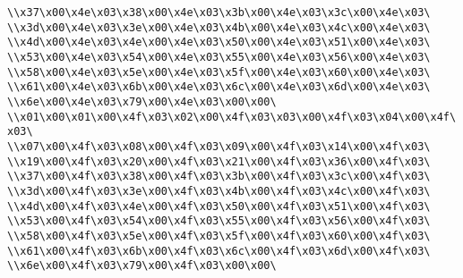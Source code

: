 \verb|\\x37\x00\x4e\x03\x38\x00\x4e\x03\x3b\x00\x4e\x03\x3c\x00\x4e\x03\|\newline
\verb|\\x3d\x00\x4e\x03\x3e\x00\x4e\x03\x4b\x00\x4e\x03\x4c\x00\x4e\x03\|\newline
\verb|\\x4d\x00\x4e\x03\x4e\x00\x4e\x03\x50\x00\x4e\x03\x51\x00\x4e\x03\|\newline
\verb|\\x53\x00\x4e\x03\x54\x00\x4e\x03\x55\x00\x4e\x03\x56\x00\x4e\x03\|\newline
\verb|\\x58\x00\x4e\x03\x5e\x00\x4e\x03\x5f\x00\x4e\x03\x60\x00\x4e\x03\|\newline
\verb|\\x61\x00\x4e\x03\x6b\x00\x4e\x03\x6c\x00\x4e\x03\x6d\x00\x4e\x03\|\newline
\verb|\\x6e\x00\x4e\x03\x79\x00\x4e\x03\x00\x00\|\newline
\verb|\\x01\x00\x01\x00\x4f\x03\x02\x00\x4f\x03\x03\x00\x4f\x03\x04\x00\x4f\x03\|\newline
\verb|\\x07\x00\x4f\x03\x08\x00\x4f\x03\x09\x00\x4f\x03\x14\x00\x4f\x03\|\newline
\verb|\\x19\x00\x4f\x03\x20\x00\x4f\x03\x21\x00\x4f\x03\x36\x00\x4f\x03\|\newline
\verb|\\x37\x00\x4f\x03\x38\x00\x4f\x03\x3b\x00\x4f\x03\x3c\x00\x4f\x03\|\newline
\verb|\\x3d\x00\x4f\x03\x3e\x00\x4f\x03\x4b\x00\x4f\x03\x4c\x00\x4f\x03\|\newline
\verb|\\x4d\x00\x4f\x03\x4e\x00\x4f\x03\x50\x00\x4f\x03\x51\x00\x4f\x03\|\newline
\verb|\\x53\x00\x4f\x03\x54\x00\x4f\x03\x55\x00\x4f\x03\x56\x00\x4f\x03\|\newline
\verb|\\x58\x00\x4f\x03\x5e\x00\x4f\x03\x5f\x00\x4f\x03\x60\x00\x4f\x03\|\newline
\verb|\\x61\x00\x4f\x03\x6b\x00\x4f\x03\x6c\x00\x4f\x03\x6d\x00\x4f\x03\|\newline
\verb|\\x6e\x00\x4f\x03\x79\x00\x4f\x03\x00\x00\|\newline
